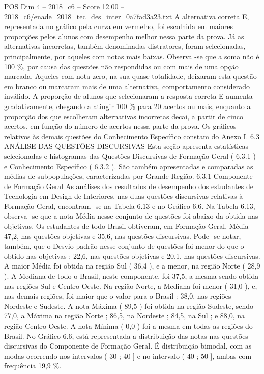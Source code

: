 \begin{textsample}{POS Dim 4 – 2018\_c6 – Score 12.00 – 2018\_c6/enade\_2018\_tec\_des\_inter\_0a7fad3a23.txt}
A alternativa correta E, representada no gráfico pela curva em vermelho, foi escolhida em maiores proporções pelos alunos com desempenho melhor nessa parte da prova.
Já as alternativas incorretas, também denominadas distratores, foram selecionadas, principalmente, por aqueles com notas mais baixas.
Observa -se que a soma não é 100 \%, por causa das questões não respondidas ou com mais de uma opção marcada.
Aqueles com nota zero, na sua quase totalidade, deixaram esta questão em branco ou marcaram mais de uma alternativa, comportamento considerado inválido.
A proporção de alunos que selecionaram a resposta correta E aumenta gradativamente, chegando a atingir 100 \% para 20 acertos ou mais, enquanto a proporção dos que escolheram alternativas incorretas decai, a partir de cinco acertos, em função do número de acertos nessa parte da prova.
Os gráficos relativos às demais questões do Conhecimento Específico constam do Anexo I. 6.3 ANÁLISE DAS QUESTÕES DISCURSIVAS Esta seção apresenta estatísticas selecionadas e histogramas das Questões Discursivas de Formação Geral ( 6.3.1 ) e Conhecimento Específico ( 6.3.2 ).
São também apresentadas e comparadas as médias de subpopulações, caracterizadas por Grande Região. 6.3.1 Componente de Formação Geral As análises dos resultados de desempenho dos estudantes de Tecnologia em Design de Interiores, nas duas questões discursivas relativas à Formação Geral, encontram -se na Tabela 6.13 e no Gráfico 6.6.
Na Tabela 6.13, observa -se que a nota Média nesse conjunto de questões foi abaixo da obtida nas objetivas.
Os estudantes de todo Brasil obtiveram, em Formação Geral, Média 47,2, nas questões objetivas e 35,6, nas questões discursivas.
Pode -se notar, também, que o Desvio padrão nesse conjunto de questões foi menor do que o obtido nas objetivas : 22,6, nas questões objetivas e 20,1, nas questões discursivas.
A maior Média foi obtida na região Sul ( 36,4 ), e a menor, na região Norte ( 28,9 ).
A Mediana de todo o Brasil, neste componente, foi 37,5, a mesma sendo obtida nas regiões Sul e Centro-Oeste.
Na região Norte, a Mediana foi menor ( 31,0 ), e, nas demais regiões, foi maior que o valor para o Brasil : 38,0, nas regiões Nordeste e Sudeste.
A nota Máxima ( 89,5 ) foi obtida na região Sudeste, sendo 77,0, a Máxima na região Norte ; 86,5, na Nordeste ; 84,5, na Sul ; e 88,0, na região Centro-Oeste.
A nota Mínima ( 0,0 ) foi a mesma em todas as regiões do Brasil.
No Gráfico 6.6, está representada a distribuição das notas nas questões discursivas do Componente de Formação Geral.
É distribuição bimodal, com as modas ocorrendo nos intervalos ( 30 ; 40 ] e no intervalo ( 40 ; 50 ], ambas com frequência 19,9 \%.

\end{textsample}
